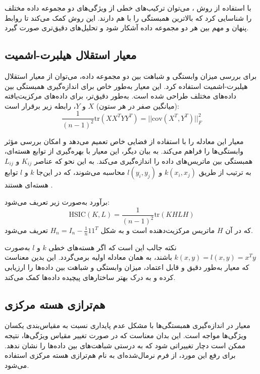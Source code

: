 با استفاده از روش
%
، می‌توان ترکیب‌های خطی از ویژگی‌های دو مجموعه داده مختلف را شناسایی کرد که بالاترین همبستگی را با هم دارند. این روش کمک می‌کند تا روابط پنهان و مهم بین هر دو مجموعه داده آشکار شود و تحلیل‌های دقیق‌تری صورت گیرد.







\subsection{
	معیار استقلال هیلبرت-اشمیت%
	}
برای بررسی میزان وابستگی و شباهت بین دو مجموعه داده، می‌توان از معیار استقلال هیلبرت-اشمیت استفاده کرد. این معیار به‌طور خاص برای اندازه‌گیری همبستگی بین داده‌های مختلف طراحی شده است. به‌طور دقیق‌تر، برای داده‌های مرکزیت‌یافته (میانگین صفر در هر ستون) \(X\) و \(Y\)، رابطه زیر برقرار است:
\begin{equation}
	\frac{1}{(n - 1)^2} \text{tr}(XX^TYY^T) = ||\text{cov}(X^T, Y^T)||_F^2
\end{equation}

معیار
این معادله را با استفاده از فضایی خاص تعمیم می‌دهد و امکان بررسی مؤثر وابستگی‌ها را فراهم می‌کند. به بیان دیگر، این معیار با بهره‌گیری از توابع هسته‌ای، همبستگی بین ماتریس‌های داده را اندازه‌گیری می‌کند. به این نحو که عناصر \(K_{ij}\) و \(L_{ij}\) به ترتیب از طریق \(k(x_i, x_j)\) و \(l(y_i, y_j)\) محاسبه می‌شوند، که در این‌جا \(k\) و \(l\) توابع هسته‌ای هستند
\cite{gretton2005measuring}.

برآورد
به‌صورت زیر تعریف می‌شود:
\begin{equation}
	\text{HSIC}(K, L) = \frac{1}{(n - 1)^2} \text{tr}(KHLH)
	\label{eq_HSIC}
\end{equation}
که در آن
\(H\)
ماتریس مرکزیت‌دهنده است و به شکل \(H_n = I_n - \frac{1}{n} 11^T\) تعریف می‌شود.

نکته جالب این است که اگر هسته‌های خطی \(k\) و \(l\) به‌صورت \(k(x, y) = l(x, y) = x^Ty\) باشند،
به همان معادله اولیه برمی‌گردد. این بدین معناست که معیار 
به‌طور دقیق و قابل اعتماد، میزان وابستگی و شباهت بین داده‌ها را ارزیابی کرده و به درک بهتر ساختارهای پیچیده داده‌ها کمک می‌کند.


\subsection{
	هم‌ترازی هسته مرکزی%
}
معیار
در اندازه‌گیری همبستگی‌ها با مشکل عدم پایداری نسبت به مقیاس‌بندی یکسان ویژگی‌ها مواجه است. این بدان معناست که در صورت تغییر مقیاس ویژگی‌ها، نتیجه
ممکن است دچار تغییراتی شود که به درستی شباهت‌های بین داده‌ها را نشان ندهد. برای رفع این مورد، از فرم نرمال‌شده‌ای به نام هم‌ترازی هسته مرکزی استفاده می‌شود.


